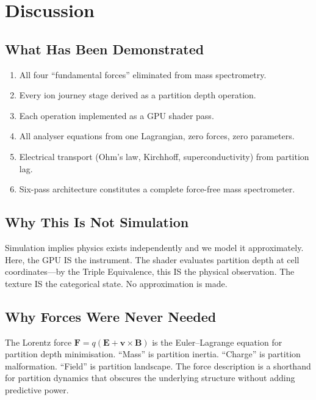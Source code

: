 \documentclass[11pt,twocolumn,a4paper]{article}
\theoremstyle{definition}
\theoremstyle{remark}
\begin{document}
\section{Discussion}
\label{sec:discussion}

\subsection{What Has Been Demonstrated}

\begin{enumerate}[nosep]
\item All four ``fundamental forces'' eliminated from mass spectrometry.
\item Every ion journey stage derived as a partition depth operation.
\item Each operation implemented as a GPU shader pass.
\item All analyser equations from one Lagrangian, zero forces, zero parameters.
\item Electrical transport (Ohm's law, Kirchhoff, superconductivity) from partition lag.
\item Six-pass architecture constitutes a complete force-free mass spectrometer.
\end{enumerate}

\subsection{Why This Is Not Simulation}

Simulation implies physics exists independently and we model it approximately. Here, the GPU IS the instrument. The shader evaluates partition depth at cell coordinates---by the Triple Equivalence, this IS the physical observation. The texture IS the categorical state. No approximation is made.

\subsection{Why Forces Were Never Needed}

The Lorentz force $\mathbf{F} = q(\mathbf{E} + \mathbf{v}\times\mathbf{B})$ is the Euler--Lagrange equation for partition depth minimisation. ``Mass'' is partition inertia. ``Charge'' is partition malformation. ``Field'' is partition landscape. The force description is a shorthand for partition dynamics that obscures the underlying structure without adding predictive power.
\end{document}
